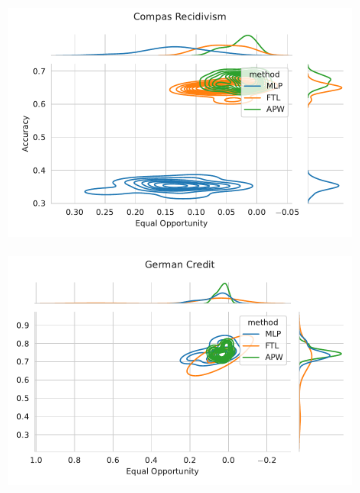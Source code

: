 \begin{figure}
\begin{subfigure}{.45\linewidth}
    \includegraphics[width=1\linewidth]{images/pareto_acc_opportunity_compas.pdf}
\end{subfigure}
\begin{subfigure}{.45\linewidth}
    \includegraphics[width=1\linewidth]{images/pareto_acc_opportunity_german.pdf}
\end{subfigure}
\end{figure}

